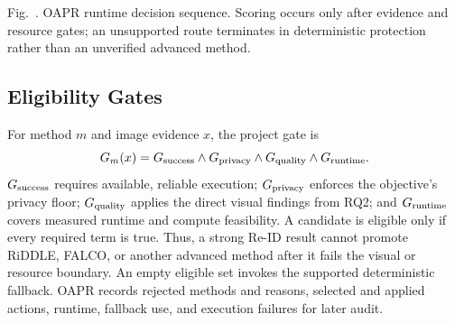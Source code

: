 \documentclass[10pt,twocolumn]{IEEEtran}
\begin{document}
\begin{strip}
\centering
{}
\vspace{2pt}

{\footnotesize Fig.~\thefigure. OAPR runtime decision
sequence. Scoring occurs only after evidence and resource gates; an unsupported
route terminates in deterministic protection rather than an unverified
advanced method.\label{fig:oapr-flow}\par}
\vspace{2pt}

\begin{minipage}[t]{0.485\textwidth}

\subsection{Eligibility Gates}

For method $m$ and image evidence $x$, the project gate is
\begin{equation}
G_m(x)=G_{\rm success}\wedge G_{\rm privacy}\wedge
G_{\rm quality}\wedge G_{\rm runtime}.
\label{eq:oapr-gate}
\end{equation}
$G_{\rm success}$ requires available, reliable execution; $G_{\rm privacy}$
enforces the objective's privacy floor; $G_{\rm quality}$ applies the direct
visual findings from RQ2; and $G_{\rm runtime}$ covers measured runtime and
compute feasibility. A candidate is eligible only if every required term is
true. Thus, a strong Re-ID result cannot promote RiDDLE, FALCO, or another
advanced method after it fails the visual or resource boundary.
An empty eligible set invokes the supported deterministic fallback. OAPR
records rejected methods and reasons, selected and applied actions, runtime,
fallback use, and execution failures for later audit.


\end{minipage}
\end{strip}
\end{document}
